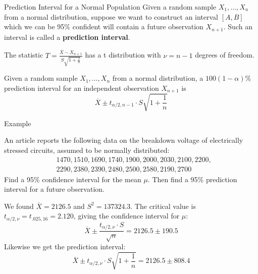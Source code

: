 \documentclass{beamer}
\renewcommand{\emph}{\textbf}
\begin{document}
\begin{frame}{Prediction Interval for a Normal Population}
Given a random sample $X_1,\dots,X_n$ from a normal distribution, suppose we want to construct an interval $[A,B]$ which we can be 95\% confident will contain a future observation $X_{n+1}$. Such an interval is called a \emph{prediction interval}.

\vspace{.2cm}\pause The statistic $T=\frac{\overline X-X_{n+1}}{S\sqrt{1+\frac1n}}$ has a t distribution with $\nu=n-1$ degrees of freedom.
\begin{block}{}
Given a random sample $X_1,\dots,X_n$ from a normal distribution, a $100(1-\alpha)\%$ prediction interval for an independent observation $X_{n+1}$ is
$$\overline X \pm t_{\alpha/2,n-1}\cdot S\sqrt{1+\frac1n}$$
\end{block}
\end{frame}

\begin{frame}{Example}
\begin{block}{}
An article reports the following data on the breakdown voltage of electrically stressed circuits, assumed to be normally distributed:
\begin{align*}
&1470, 1510, 1690, 1740, 1900, 2000, 2030, 2100, 2200, \\
& 2290, 2380, 2390, 2480, 2500, 2580, 2190, 2700
\end{align*}
Find a 95\% confidence interval for the mean $\mu$. Then find a 95\% prediction interval for a future observation.
\end{block}

We found $\overline X=2126.5$ and $S^2=137324.3$.
The critical value is $t_{\alpha/2,\nu}=t_{.025,16}=2.120$, giving the confidence interval for $\mu$:
$$\overline{X} \pm \frac{t_{\alpha/2,\nu}\cdot S}{\sqrt{n}} = 2126.5 \pm 190.5$$
Likewise we get the prediction interval:
$$\overline X \pm t_{\alpha/2,\nu}\cdot S\sqrt{1+\frac1n} = 2126.5 \pm 808.4$$
\end{frame}
\end{document}
